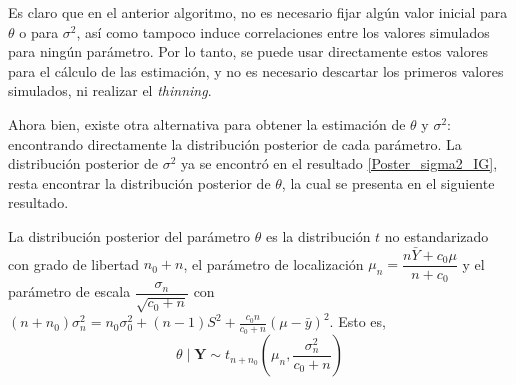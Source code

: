 \documentclass[10pt,openright]{book}\usepackage[]{graphicx}\usepackage[]{color}
\begin{document}
Es claro que en el anterior algoritmo, no es necesario fijar alg\'un valor inicial para $\theta$ o para $\sigma^2$, as\'i como tampoco induce correlaciones entre los valores simulados para ning\'un par\'ametro. Por lo tanto, se puede usar directamente estos valores para el c\'alculo de las estimaci\'on, y no es necesario descartar los primeros valores simulados, ni realizar el \emph{thinning}.

Ahora bien, existe otra alternativa para obtener la estimaci\'on de $\theta$ y $\sigma^2$: encontrando directamente la distribuci\'on posterior de cada par\'ametro. La distribuci\'on posterior de $\sigma^2$ ya se encontr\'o en el resultado \ref{Poster_sigma2_IG}, resta encontrar la distribuci\'on posterior de $\theta$, la cual se presenta en el siguiente resultado. 

\begin{Res}\label{Pos_theta_t_noestandar}
La distribuci\'on posterior del par\'ametro $\theta$ es la distribuci\'on $t$ no estandarizado con grado de libertad $n_0+n$, el par\'ametro de localizaci\'on $\mu_n=\dfrac{n\bar{Y}+c_0\mu}{n+c_0}$ y el par\'ametro de escala $\dfrac{\sigma_n}{\sqrt{c_0+n}}$ con $(n+n_0)\sigma^2_n=n_0\sigma^2_0+(n-1)S^2+\frac{c_0n}{c_0+n}(\mu-\bar{y})^2$. Esto es, 
\begin{equation*}
\theta \mid \mathbf{Y} \sim t_{n+n_0}\left(\mu_n, \frac{\sigma^2_n}{c_0+n}\right)
\end{equation*}
\end{Res}
\end{document}
